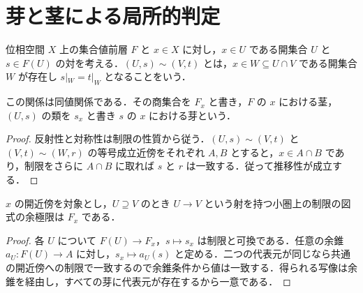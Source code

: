 \section{芽と茎による局所的判定}
\begin{defn}[芽の同値関係]
位相空間 $X$ 上の集合値前層 $F$ と $x\in X$ に対し，$x\in U$ である開集合 $U$ と $s\in F(U)$ の対を考える．$(U,s)\sim(V,t)$ とは，$x\in W\subseteq U\cap V$ である開集合 $W$ が存在し $s|_W=t|_W$ となることをいう．
\end{defn}
\begin{prop}[茎の構成]
この関係は同値関係である．その商集合を $F_x$ と書き，$F$ の $x$ における茎，$(U,s)$ の類を $s_x$ と書き $s$ の $x$ における芽という．
\end{prop}
\begin{proof}
反射性と対称性は制限の性質から従う．$(U,s)\sim(V,t)$ と $(V,t)\sim(W,r)$ の等号成立近傍をそれぞれ $A,B$ とすると，$x\in A\cap B$ であり，制限をさらに $A\cap B$ に取れば $s$ と $r$ は一致する．従って推移性が成立する．
\end{proof}
\begin{prop}[茎の余極限としての表示]
$x$ の開近傍を対象とし，$U\supseteq V$ のとき $U\to V$ という射を持つ小圏上の制限の図式の余極限は $F_x$ である．
\end{prop}
\begin{proof}
各 $U$ について $F(U)\to F_x$，$s\mapsto s_x$ は制限と可換である．任意の余錐 $a_U:F(U)\to A$ に対し，$s_x\mapsto a_U(s)$ と定める．二つの代表元が同じなら共通の開近傍への制限で一致するので余錐条件から値は一致する．得られる写像は余錐を経由し，すべての芽に代表元が存在するから一意である．
\end{proof}
